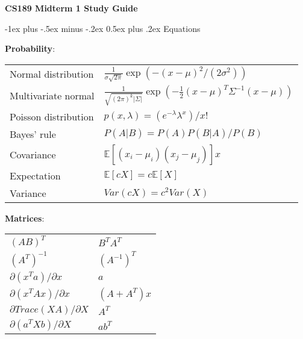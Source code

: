 \documentclass[10pt,landscape]{article}
\makeatletter
\renewcommand{\section}{\@startsection{section}{1}{0mm}%
                                {-1ex plus -.5ex minus -.2ex}%
                                {0.5ex plus .2ex}%
                                {\normalfont\large\bfseries}}
\makeatother
\begin{document}
\raggedright
\footnotesize
\begin{multicols}{3}


\setlength{\premulticols}{1pt}
\setlength{\postmulticols}{1pt}
\setlength{\multicolsep}{1pt}
\setlength{\columnsep}{2pt}

\begin{center}
\textbf{CS189 Midterm 1 Study Guide}
\end{center}



\section{Equations}

\textbf{Probability}:

\begin{tabular}{@{}ll@{}}
Normal distribution         & $\frac{1}{\sigma \sqrt{2\pi}}\exp(-(x-\mu)^2 / (2\sigma^2))$ \\
Multivariate normal         & $\frac{1}{\sqrt{(2\pi)^k |\Sigma|}} \exp(-\frac{1}{2}(x-\mu)^T \Sigma^{-1}(x-\mu))$ \\

Poisson distribution        & $p(x, \lambda) = (e^{-\lambda}\lambda^x)/x!$ \\
Bayes' rule                 & $P(A|B) = P(A)P(B|A) / P(B)$ \\
Covariance                  & $\mathbb{E}[(x_i - \mu_i)(x_j - \mu_j)]x$ \\
Expectation                 & $\mathbb{E}[cX] = c\mathbb{E}[X]$ \\
Variance                    & $Var(cX) = c^2 Var(X)$ \\
\end{tabular}

\textbf{Matrices}:

\begin{tabular}{@{}ll@{}}
$(AB)^T$                            & $B^T A^T$ \\
$(A^T)^{-1}$                        & $(A^{-1})^T$ \\
$\partial(x^T a) / \partial x$      & $a$ \\
$\partial(x^T Ax) / \partial x$     & $(A + A^T) x$ \\
$\partial Trace(XA) / \partial X$   & $A^T$ \\
$\partial(a^T Xb) / \partial X$     & $ab^T$
\end{tabular}


\end{multicols}
\end{document}
